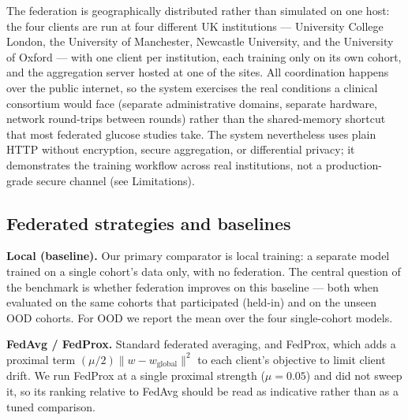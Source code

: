 \documentclass[10pt,letterpaper]{article}
\begin{document}
The federation is geographically distributed rather than simulated on one host:
the four clients are run at four different UK institutions --- University College
London, the University of Manchester, Newcastle University, and the University of
Oxford --- with one client per institution, each training only on its own cohort,
and the aggregation server hosted at one of the sites. All coordination happens
over the public internet, so the system exercises the real conditions a clinical
consortium would face (separate administrative domains, separate hardware,
network round-trips between rounds) rather than the shared-memory shortcut that
most federated glucose studies take. The system nevertheless uses plain HTTP
without encryption, secure aggregation, or differential privacy; it demonstrates
the training workflow across real institutions, not a production-grade secure
channel (see Limitations).

\subsection*{Federated strategies and baselines}

\textbf{Local (baseline).} Our primary comparator is local training: a separate
model trained on a single cohort's data only, with no federation. The central
question of the benchmark is whether federation improves on this baseline ---
both when evaluated on the same cohorts that participated (held-in) and on the
unseen OOD cohorts. For OOD we report the mean over the four single-cohort models.

\textbf{FedAvg / FedProx.} Standard federated averaging, and FedProx, which adds
a proximal term $(\mu/2)\lVert w - w_{\text{global}}\rVert^2$ to each client's
objective to limit client drift. We run FedProx at a single proximal strength
($\mu=0.05$) and did not sweep it, so its ranking relative to FedAvg should be
read as indicative rather than as a tuned comparison.
\end{document}
